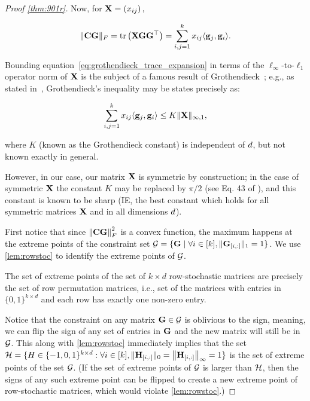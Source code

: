 \begin{proof}[Proof \cref{thm:901r}]
Now, for $\mathbf{X} = \left(x_{ij}\right),$

\begin{equation}\label{eq:grothendieck_trace_expansion}
\|\mathbf{C}\mathbf{G}\|_F = \mathrm{tr}\left(\mathbf{X}\mathbf{G}\mathbf{G}^\top\right) = \sum_{i, j=1}^k x_{ij}\langle\mathbf{g}_j, \mathbf{g}_i\rangle.
\end{equation}

Bounding equation~\cref{eq:grothendieck_trace_expansion} in terms of the $\ell_\infty$-to-$\ell_1$ operator norm of $\mathbf{X}$ is the subject of a famous result of Grothendieck~\citep{grothendieck1956resume}; e.g., as stated in~\citep{Lindenstrauss1968}, Grothendieck's inequality may be states precisely as:

\begin{equation}\label{eq:grothendieck_bound}
     \sum_{i, j=1}^k x_{ij}\langle\mathbf{g}_j, \mathbf{g}_i\rangle \leq K \|\mathbf{X}\|_{\infty, 1},
\end{equation}

where $K$ (known as the Grothendieck constant) is independent of $d$, but not known exactly in general.

However, in our case, our matrix $\mathbf{X}$ is symmetric by construction; in the case of symmetric $\mathbf{X}$ the constant $K$ may be replaced by $\pi / 2$ (see Eq. 43 of \citep{khot2011grothendiecktype}), and this constant is known to be sharp (IE, the best constant which holds for all symmetric matrices $\mathbf{X}$ and in all dimensions $d$).

 First notice that since $\left\|\mathbf{C}\mathbf{G}\right\|_F^2$ is a convex function, the maximum happens at the extreme points of the constraint set $\mathcal{G} = \{\mathbf{G} \mid \forall i \in [k], \|\mathbf{G}_{[i, :]}\|_1 = 1\}$. We use \cref{lem:rowstoc} to identify the extreme points of $\mathcal{G}$.

\begin{claim}
The set of extreme points of the set of $k\times d$ row-stochastic matrices are precisely the set of row permutation matrices, i.e., set of the matrices with entries in $\{0,1\}^{k \times d}$ and each row has exactly one non-zero entry.
\label{lem:rowstoc}
\end{claim}
Notice that the constraint on any matrix $\mathbf{G}\in\mathcal{G}$ is oblivious to the sign, meaning, we can flip the sign of any set of entries in $\mathbf{G}$ and the new matrix will still be in $\mathcal{G}$. This along with \cref{lem:rowstoc} immediately implies that the set $\mathcal{H}=\{H\in\{-1,0,1\}^{k\times d}: \forall i\in[k], \|\mathbf{H}_{[i,:]}\|_0=\left\|\mathbf{H}_{[i,:]}\right\|_\infty=1\}$ is the set of extreme points of the set $\mathcal{G}$. (If the set of extreme points of $\mathcal{G}$ is larger than $\mathcal{H}$, then the signs of any such extreme point can be flipped to create a new extreme point of row-stochastic matrices, which would violate \cref{lem:rowstoc}.)


\end{proof}
